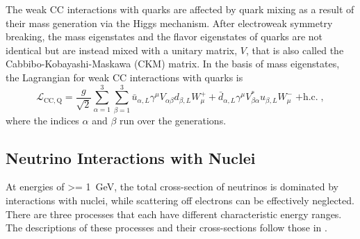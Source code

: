 The weak CC interactions with quarks are affected by quark mixing as a result of their mass generation via the Higgs mechanism. After electroweak symmetry breaking, the mass eigenstates and the flavor eigenstates of quarks are not identical but are instead mixed with a unitary matrix, $V$, that is also called the Cabbibo-Kobayashi-Maskawa (CKM) matrix. In the basis of mass eigenstates, the Lagrangian for weak CC interactions with quarks is
\begin{equation}
    \mathcal{L}_\mathrm{CC,Q} = \frac{g}{\sqrt{2}} \sum_{\alpha=1}^3 \sum_{\beta=1}^3 
    \bar{u}_{\alpha,L}\gamma^\mu V_{\alpha \beta} d_{\beta,L} W_\mu^+
     + \bar{d}_{\alpha,L}\gamma^\mu V_{\beta \alpha}^* u_{\beta,L} W_\mu^-
    \;\mathrm{+h.c.}\;,
\end{equation}
where the indices $\alpha$ and $\beta$ run over the generations. 

\subsection{Neutrino Interactions with Nuclei}
\label{sec:neutrino-xsec}

At energies of \SI{>= 1}{\giga\eV}, the total cross-section of neutrinos is dominated by interactions with nuclei, while scattering off electrons can be effectively neglected. There are three processes that each have different characteristic energy ranges. The descriptions of these processes and their cross-sections follow those in .

